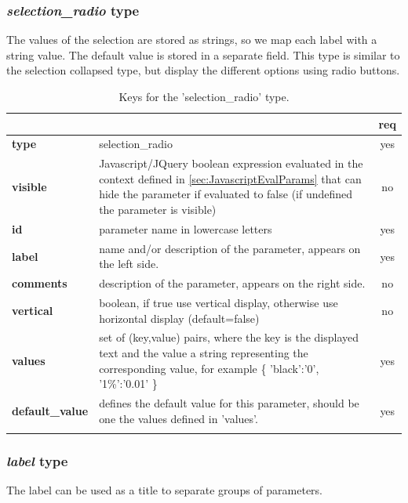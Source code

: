 \subsubsection{ \emph{selection\_radio} type}

The values of the selection are stored as strings, so we map each label with a 
string value. The default value is stored in a separate field.
This type is similar to the selection collapsed type, but display the different
options using radio buttons.

\begin{longtable}{|>{\bf}L{\linewidth}|L{\linewidth}|c|}
\hline
      &  & {\bf req} 
\tabularnewline \hline \hline
 type     & selection\_radio    & yes \\ \hline
 visible  & Javascript/JQuery boolean expression evaluated in the context defined 
              in \ref{sec:JavascriptEvalParams} that can hide the parameter if
            evaluated to false (if undefined the parameter is visible)& no \\ \hline
 id       & parameter name in lowercase letters & yes \\ \hline
 label  & name and/or description of the parameter, appears on the left side. & yes
                      \\ \hline
 comments & description of the parameter, appears on the right side. & no
                      \\ \hline
 vertical & boolean, if true use vertical display, otherwise use horizontal
            display (default=false) & no \\ \hline
 values   & set of (key,value) pairs, where the key is the displayed text and the 
value a string representing the corresponding value, for example \{ 
'black':'0', '1\%':'0.01' \} & yes
                      \\ \hline
 default\_value & defines the default value for this parameter, should be one 
the values defined in 'values'. & yes \\ \hline
\caption{Keys for the 'selection\_radio' type.}
\end{longtable}

\subsubsection{ \emph{label} type}

The label  can be used as a title to separate groups of parameters.

